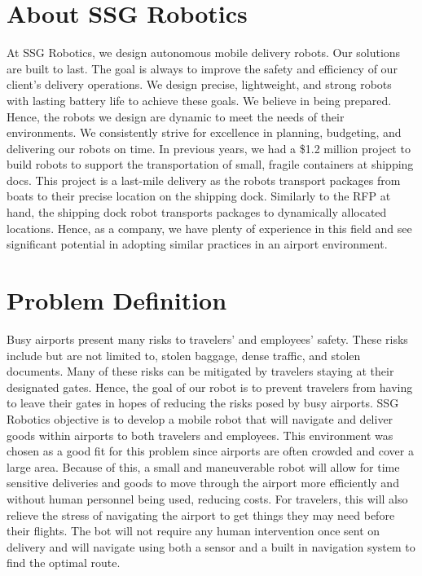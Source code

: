 \documentclass[letterpaper,fleqn,oneside]{template}
\begin{document}
\section{About SSG Robotics}
At SSG Robotics, we design autonomous mobile delivery robots. Our solutions are built to last. The goal is always to improve the safety and efficiency of our client’s delivery operations. We design precise, lightweight, and strong robots with lasting battery life to achieve these goals. We believe in being prepared. Hence, the robots we design are dynamic to meet the needs of their environments. We consistently strive for excellence in planning, budgeting, and delivering our robots on time. In previous years, we had a \$1.2 million project to build robots to support the transportation of small, fragile containers at shipping docs. This project is a last-mile delivery as the robots transport packages from boats to their precise location on the shipping dock. Similarly to the RFP at hand, the shipping dock robot transports packages to dynamically allocated locations. Hence, as a company, we have plenty of experience in this field and see significant potential in adopting similar practices in an airport environment.


\section{Problem Definition}
Busy airports present many risks to travelers' and employees' safety. These risks include but are not limited to, stolen baggage, dense traffic, and stolen documents. Many of these risks can be mitigated by travelers staying at their designated gates. Hence, the goal of our robot is to prevent travelers from having to leave their gates in hopes of reducing the risks posed by busy airports. SSG Robotics objective is to develop a mobile robot that will navigate and deliver goods within airports to both travelers and employees. This environment was chosen as a good fit for this problem since airports are often crowded and cover a large area. Because of this, a small and maneuverable robot will allow for time sensitive deliveries and goods to move through the airport more efficiently and without human personnel being used, reducing costs. For travelers, this will also relieve the stress of navigating the airport to get things they may need before their flights. The bot will not require any human intervention once sent on delivery and will navigate using both a sensor and a built in navigation system to find the optimal route. 
\end{document}
